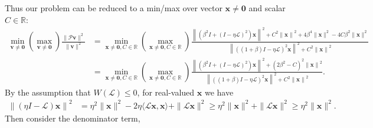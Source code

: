 \documentclass[a4paper,10pt]{article}
\begin{document}
Thus our problem can be reduced to a min/max over vector $\mathbf{x}\neq\mathbf{0}$
and scalar $C\in\mathbb{R}$:
\begin{align*}
\min_{\mathbf{v}\neq\mathbf{0}} (\max_{\mathbf{v}\neq\mathbf{0}})
	\frac{\|\mathcal{P}\mathbf{v}\|^2}{\|\mathbf{v}\|^2}
& = \min_{\mathbf{x}\neq\mathbf{0}, C\in\mathbb{R}}
		(\max_{\mathbf{x}\neq\mathbf{0}, C\in\mathbb{R}})
	\frac{\left\|(\beta^2I + (I - \eta\mathcal{L})^{2})\mathbf{x}\right\|^2 +
			C^2\left\|\mathbf{x}\right\|^2
			+ 4\beta^4\|\mathbf{x}\|^2 - 4C\beta^2\|\mathbf{x}\|^2}
		{\left\|((1+\beta)I - \eta\mathcal{L})^{2}\mathbf{x}\right\|^2 +
			C^2\left\|\mathbf{x}\right\|^2} \\
& = \min_{\mathbf{x}\neq\mathbf{0}, C\in\mathbb{R}}
		(\max_{\mathbf{x}\neq\mathbf{0}, C\in\mathbb{R}})
	\frac{\left\|(\beta^2I + (I - \eta\mathcal{L})^{2})\mathbf{x}\right\|^2 +
			(2\beta^2 - C)^2\left\|\mathbf{x}\right\|^2}
		{\left\|((1+\beta)I - \eta\mathcal{L})^{2}\mathbf{x}\right\|^2 +
			C^2\left\|\mathbf{x}\right\|^2} .
\end{align*}
%
By the assumption that $W(\mathcal{L}) \leq 0$, for real-valued $\mathbf{x}$ we have
%
\begin{align*}
\left\|(\eta I - \mathcal{L})\mathbf{x}\right\|^2 & =
	\eta^2\|\mathbf{x}\|^2 - 2\eta\langle \mathcal{L}\mathbf{x},\mathbf{x}\rangle +
		\|\mathcal{L}\mathbf{x}\|^2
\geq \eta^2\|\mathbf{x}\|^2 + \|\mathcal{L}\mathbf{x}\|^2 \geq \eta^2\|\mathbf{x}\|^2.
\end{align*}
%
Then consider the denominator term, 
%
\end{document}

